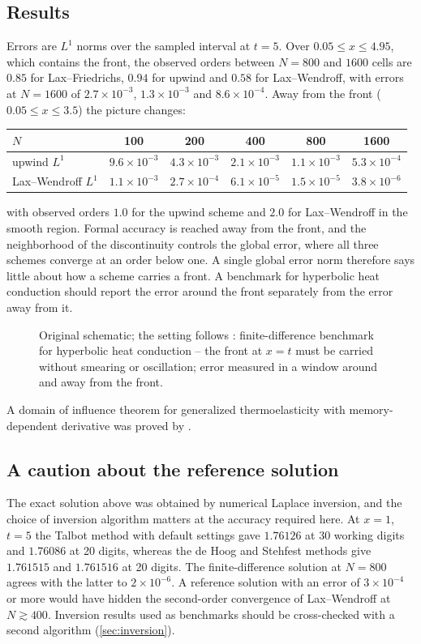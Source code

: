 \subsection{Results}
Errors are $L^1$ norms over the sampled interval at $t=5$. Over $0.05\le x\le4.95$, which contains the front, the observed orders between $N=800$ and $1600$ cells are $0.85$ for Lax--Friedrichs, $0.94$ for upwind and $0.58$ for Lax--Wendroff, with errors at $N=1600$ of $2.7\times10^{-3}$, $1.3\times10^{-3}$ and $8.6\times10^{-4}$. Away from the front ($0.05\le x\le3.5$) the picture changes:
\begin{center}
\begin{tabular}{@{}lccccc@{}}\toprule
$N$ & 100 & 200 & 400 & 800 & 1600\\\midrule
upwind $L^1$ & $9.6\times10^{-3}$ & $4.3\times10^{-3}$ & $2.1\times10^{-3}$ & $1.1\times10^{-3}$ & $5.3\times10^{-4}$\\
Lax--Wendroff $L^1$ & $1.1\times10^{-3}$ & $2.7\times10^{-4}$ & $6.1\times10^{-5}$ & $1.5\times10^{-5}$ & $3.8\times10^{-6}$\\
\bottomrule\end{tabular}
\end{center}
with observed orders $1.0$ for the upwind scheme and $2.0$ for Lax--Wendroff in the smooth region. Formal accuracy is reached away from the front, and the neighborhood of the discontinuity controls the global error, where all three schemes converge at an order below one. A single global error norm therefore says little about how a scheme carries a front. A benchmark for hyperbolic heat conduction should report the error around the front separately from the error away from it.

\begin{figure}[t!]\centering\small

\caption{Original schematic; the setting follows \citep{Joseph1990}: finite-difference benchmark for hyperbolic heat conduction -- the front at $x=t$ must be carried without smearing or oscillation; error measured in a window around and away from the front.}\label{fig:schemes-geo}
\end{figure}

A domain of influence theorem for generalized thermoelasticity with memory-dependent derivative was proved by \citep{Sarkar2019a}.

\subsection{A caution about the reference solution}
The exact solution above was obtained by numerical Laplace inversion, and the choice of inversion algorithm matters at the accuracy required here. At $x=1$, $t=5$ the Talbot method with default settings gave $1.76126$ at 30 working digits and $1.76086$ at 20 digits, whereas the de Hoog and Stehfest methods give $1.761515$ and $1.761516$ at 20 digits. The finite-difference solution at $N=800$ agrees with the latter to $2\times10^{-6}$. A reference solution with an error of $3\times10^{-4}$ or more would have hidden the second-order convergence of Lax--Wendroff at $N\gtrsim400$. Inversion results used as benchmarks should be cross-checked with a second algorithm (\cref{sec:inversion}).


